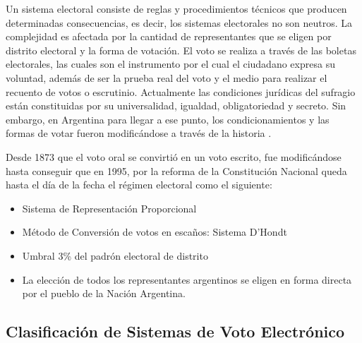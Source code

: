 Un sistema electoral consiste de reglas y procedimientos técnicos que producen determinadas consecuencias, es decir, los sistemas electorales no son neutros. 
La complejidad es afectada por la cantidad de representantes que se eligen por distrito electoral y la forma de votación. El voto se realiza a través de las boletas electorales, las cuales son el instrumento por el cual el ciudadano expresa su voluntad, además de ser la prueba real del voto y el medio para realizar el recuento de votos o escrutinio.
Actualmente las condiciones jurídicas del sufragio están constituidas por su universalidad, igualdad, obligatoriedad y secreto. Sin embargo, en Argentina para llegar a ese punto, los condicionamientos y las formas de votar fueron modificándose a través de la historia \cite{historia}.\newline

Desde 1873 que el voto oral se convirtió en un voto escrito, fue modificándose hasta conseguir que en 1995, por la reforma de la Constitución Nacional queda hasta el día de la fecha el régimen electoral como el siguiente:
\begin{itemize}
    \item Sistema de Representación Proporcional
    \item Método de Conversión de votos en escaños: Sistema D'Hondt
    \item Umbral 3\% del padrón electoral de distrito
    \item La elección de todos los representantes argentinos se eligen en forma directa por el pueblo de la Nación Argentina.
\end{itemize}
\newline





\subsection{Clasificación de Sistemas de Voto Electrónico}


